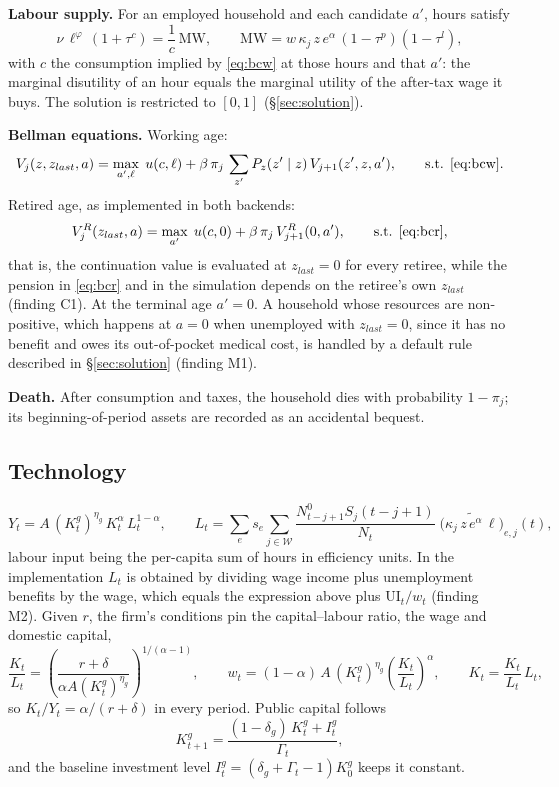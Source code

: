 \documentclass[11pt,a4paper]{article}
\begin{document}
\textbf{Labour supply.} For an employed household and each candidate $a'$, hours satisfy
\[
\nu\,\ell^{\varphi}\,(1+\tau^c) = \frac{1}{c}\,\mathrm{MW}, \qquad \mathrm{MW} = w\,\kappa_j\, z\, e^{\alpha}\,(1-\tau^p)(1-\tau^l),
\]
with $c$ the consumption implied by \eqref{eq:bcw} at those hours and that $a'$: the marginal disutility of an hour equals the marginal utility of the after-tax wage it buys. The solution is restricted to $[0, 1]$ (\S\ref{sec:solution}).

\textbf{Bellman equations.} Working age:
\[
V_j(z, z_{last}, a) = \max_{a', \ell}\; u(c, \ell) + \beta\,\pi_j\, \sum_{z'} P_z(z' \mid z)\, V_{j+1}(z', z, a'), \qquad \text{s.t. } \eqref{eq:bcw}.
\]
Retired age, as implemented in both backends:
\[
V^R_j(z_{last}, a) = \max_{a'}\; u(c, 0) + \beta\,\pi_j\, V^R_{j+1}(0, a'), \qquad \text{s.t. } \eqref{eq:bcr},
\]
that is, the continuation value is evaluated at $z_{last} = 0$ for every retiree, while the pension in \eqref{eq:bcr} and in the simulation depends on the retiree's own $z_{last}$ (finding C1). At the terminal age $a' = 0$. A household whose resources are non-positive, which happens at $a = 0$ when unemployed with $z_{last} = 0$, since it has no benefit and owes its out-of-pocket medical cost, is handled by a default rule described in \S\ref{sec:solution} (finding M1).

\textbf{Death.} After consumption and taxes, the household dies with probability $1 - \pi_j$; its beginning-of-period assets are recorded as an accidental bequest.

\subsection{Technology}\label{sec:tech}

\[
Y_t = A\,(K^g_t)^{\eta_g}\, K_t^{\alpha}\, L_t^{1-\alpha}, \qquad
L_t = \sum_e s_e \sum_{j \in \mathcal{W}} \frac{N^0_{t-j+1} S_j(t-j+1)}{N_t}\; \widetilde{\bigl(\kappa_j\, z\, e^{\alpha}\, \ell\bigr)}_{e,j}(t),
\]
labour input being the per-capita sum of hours in efficiency units. In the implementation $L_t$ is obtained by dividing wage income plus unemployment benefits by the wage, which equals the expression above plus $\mathrm{UI}_t/w_t$ (finding M2). Given $r$, the firm's conditions pin the capital--labour ratio, the wage and domestic capital,
\[
\frac{K_t}{L_t} = \left(\frac{r + \delta}{\alpha A (K^g_t)^{\eta_g}}\right)^{1/(\alpha - 1)}, \qquad
w_t = (1-\alpha)\, A\,(K^g_t)^{\eta_g} \left(\frac{K_t}{L_t}\right)^{\alpha}, \qquad K_t = \frac{K_t}{L_t}\, L_t,
\]
so $K_t/Y_t = \alpha/(r+\delta)$ in every period. Public capital follows
\[
K^g_{t+1} = \frac{(1-\delta_g)\, K^g_t + I^g_t}{\Gamma_t},
\]
and the baseline investment level $I^g_t = (\delta_g + \Gamma_t - 1)K^g_0$ keeps it constant.
\end{document}
